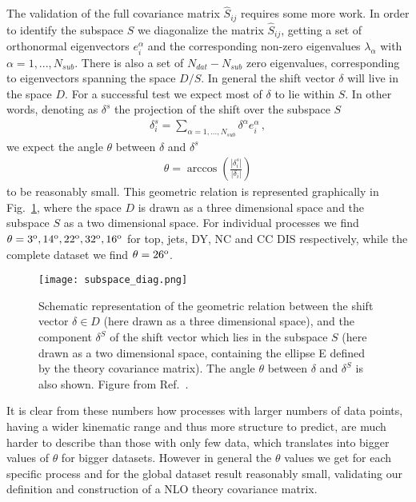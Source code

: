     The validation of the full covariance matrix $\hat{S}_{ij}$ requires some more work.
    In order to identify the subspace $S$ we diagonalize the matrix $\hat{S}_{ij}$, getting a set
    of orthonormal eigenvectors $e_i^{\alpha}$ and the corresponding non-zero eigenvalues 
    $\lambda_{\alpha}$ with $\alpha = 1, ..., N_{sub}$.
    There is also a set of $N_{dat}-N_{sub}$ zero eigenvalues, corresponding to eigenvectors spanning
    the space $D/S$.
    In general the shift vector $\delta$ will live in the space $D$. 
    For a successful test we expect most of $\delta$ to lie within $S$.
    In other words, denoting as $\delta^s$ the projection of the shift over the subspace $S$
    \begin{align}
        \delta_i^s = \sum_{\alpha=1,...,N_{sub}} \delta^{\alpha}e^{\alpha}_i\,,
    \end{align} 
    we expect the angle $\theta$ between $\delta$ and $\delta^s$
    \begin{align}
        \label{eq:angle}
        \theta = \arccos\left(\frac{|\delta_i^s|}{|\delta_i|}\right)
    \end{align}
    to be reasonably small. This geometric relation is represented graphically in Fig.~\ref{fig:subspace_diagram},
    where the space $D$ is drawn as a three dimensional space and the subspace $S$ as a two dimensional space.
    For individual processes we find $\theta = 3^{\rm o}, 14^{\rm o}, 22^{\rm o}, 32^{\rm o}, 16^{\rm o}$ for top, jets, DY, NC and CC DIS respectively, 
    while the complete dataset we find $\theta = 26^{\rm o}$.
    \begin{figure}[t]
        \begin{center}
          \texttt{[image: subspace\_diag.png]}
          \caption{\small Schematic representation of the geometric relation
            between the shift vector $\delta\in D$ (here drawn as a three dimensional space), and
            the component $\delta^S$ of the shift vector which lies in the 
      subspace $S$ (here drawn as a two dimensional space, containing the ellipse E defined by the theory covariance matrix). 
      The angle $\theta$ between $\delta$ and $\delta^S$ is also shown. Figure from Ref.~\cite{AbdulKhalek:2019ihb}.
          \label{fig:subspace_diagram} }
        \end{center}
      \end{figure}
    It is clear from these numbers how processes with larger numbers of data points, having 
    a wider kinematic range and thus more structure to predict, are much harder to describe than those 
    with only few data, which translates into bigger values of $\theta$ for bigger datasets. However in general the
    $\theta$ values we get for each specific process and for the global dataset result reasonably small, validating our definition
    and construction of a NLO theory covariance matrix.

